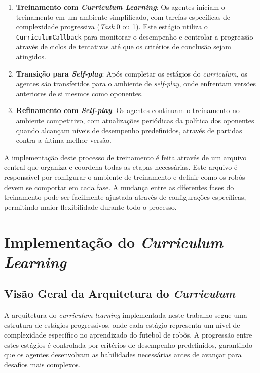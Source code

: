 \begin{enumerate}
    \item \textbf{Treinamento com \textit{Curriculum Learning}}: Os agentes iniciam o treinamento em um ambiente simplificado, com tarefas específicas de complexidade progressiva (\textit{Task} 0 ou 1). Este estágio utiliza o \texttt{CurriculumCallback} para monitorar o desempenho e controlar a progressão através de ciclos de tentativas até que os critérios de conclusão sejam atingidos.
    
    \item \textbf{Transição para \textit{Self-play}}: Após completar os estágios do \textit{curriculum}, os agentes são transferidos para o ambiente de \textit{self-play}, onde enfrentam versões anteriores de si mesmos como oponentes.
    
    \item \textbf{Refinamento com \textit{Self-play}}: Os agentes continuam o treinamento no ambiente competitivo, com atualizações periódicas da política dos oponentes quando alcançam níveis de desempenho predefinidos, através de partidas contra a última melhor versão.
\end{enumerate}

A implementação deste processo de treinamento é feita através de um arquivo central que organiza e coordena todas as etapas necessárias. Este arquivo é responsável por configurar o ambiente de treinamento e definir como os robôs devem se comportar em cada fase. A mudança entre as diferentes fases do treinamento pode ser facilmente ajustada através de configurações específicas, permitindo maior flexibilidade durante todo o processo.

\section{Implementação do \textit{Curriculum Learning}}
\label{sec:implementacao_cl}

\subsection{Visão Geral da Arquitetura do \textit{Curriculum}}

A arquitetura do \textit{curriculum learning} implementada neste trabalho segue uma estrutura de estágios progressivos, onde cada estágio representa um nível de complexidade específico no aprendizado do futebol de robôs. A progressão entre estes estágios é controlada por critérios de desempenho predefinidos, garantindo que os agentes desenvolvam as habilidades necessárias antes de avançar para desafios mais complexos.

